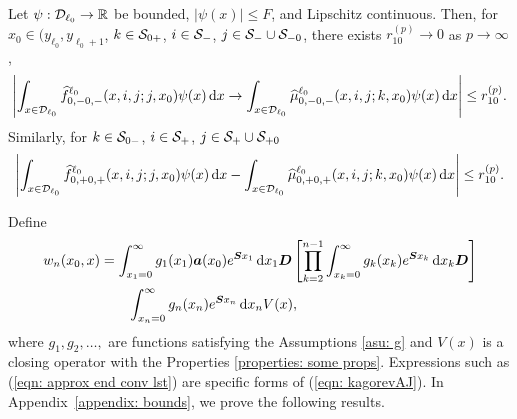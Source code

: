\begin{cor}\label{cor: Dcoajc}
	Let \(\psi:\mathcal{D}_{\ell_0}\to \mathbb R\) be bounded, \(|\psi(x)|\leq F\), and Lipschitz continuous. Then, for \(x_0\in(y_{\ell_0},y_{\ell_0+1}\), \(k\in\mathcal{S}_{0+}\), \(i\in\mathcal{S}_-\), \(j\in\mathcal{S}_-\cup\mathcal{S}_{-0}\), there exists \(r_{10}^{(p)}\to 0\) as \(p \to \infty\), 
	\begin{align}
		\left|\int_{x\in\mathcal{D}_{\ell_0}} \widehat f_{0,-0,-}^{\ell_0}(x,i,j;j,x_0)\psi(x)\, \mathrm{d} x  \to \int_{x\in\mathcal{D}_{\ell_0}} \widehat \mu_{0,-0,-}^{\ell_0}(x,i,j;k,x_0)\psi(x)\, \mathrm{d} x\right|\leq r_{10}^{(p)}.\label{eqn:xs}
	\end{align}
	Similarly, for \(k\in\mathcal{S}_{0-}\), \(i\in\mathcal{S}_+\), \(j\in\mathcal{S}_+\cup\mathcal{S}_{+0}\)
	\begin{align}
		\left|\int_{x\in\mathcal{D}_{\ell_0}} \widehat f_{0,+0,+}^{\ell_0}(x,i,j;j,x_0)\psi(x)\, \mathrm{d} x  - \int_{x\in\mathcal{D}_{\ell_0}} \widehat \mu_{0,+0,+}^{\ell_0}(x,i,j;k,x_0)\psi(x)\, \mathrm{d} x\right|\leq r_{10}^{(p)}.\label{eqn:!124mcds}
	\end{align}
\end{cor}

Define 
\begin{align}
		w_n(x_0,x) &= \int_{x_1=0}^\infty g_1(x_1) \boldsymbol a (x_0) e^{\boldsymbol{S}x_1}\, \mathrm{d} x_1\boldsymbol D 
            	\left[\prod_{k=2}^{n-1}\int_{x_k=0}^\infty g_k(x_k) e^{\boldsymbol{S}x_k} \, \mathrm{d} x_k \boldsymbol D\right] \nonumber 
		\\&\qquad{} \int_{x_n=0}^\infty g_{n}(x_n) e^{\boldsymbol{S}x_n} \, \mathrm{d} x_n V(x), \label{eqn: kagorevAJ}
\end{align}
where \(g_1,g_2,\dots,\) are functions satisfying the Assumptions \ref{asu: g} and \(V(x)\) is a closing operator with the Properties \ref{properties: some props}. Expressions such as (\ref{eqn: approx end conv lst}) are specific forms of (\ref{eqn: kagorevAJ}). In Appendix~\ref{appendix: bounds}, we prove the following results. %

